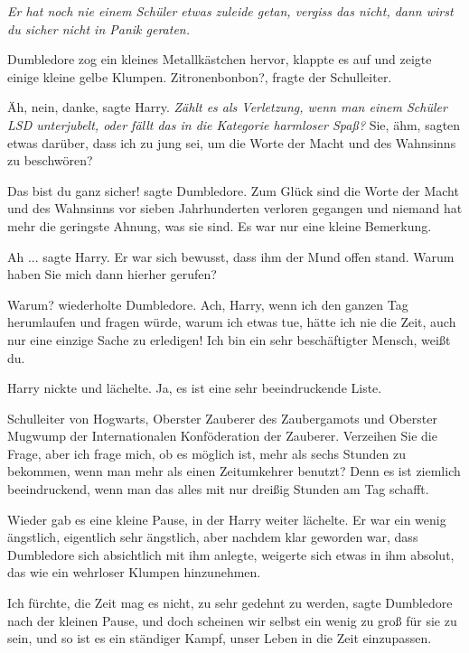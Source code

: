 \emph{Er hat noch nie einem Schüler etwas zuleide getan, vergiss das nicht, dann
wirst du sicher nicht in Panik geraten.}

Dumbledore zog ein kleines Metallkästchen hervor, klappte es auf und zeigte
einige kleine gelbe Klumpen. \glqq Zitronenbonbon?\grqq{}, fragte der
Schulleiter.

\glqq Äh, nein, danke\grqq{}, sagte Harry. \emph{Zählt es als Verletzung, wenn
man einem Schüler LSD unterjubelt, oder fällt das in die Kategorie harmloser
Spaß?} \glqq Sie, ähm, sagten etwas darüber, dass ich zu jung sei, um die Worte
der Macht und des Wahnsinns zu beschwören?\grqq{}

\glqq Das bist du ganz sicher!\grqq{} sagte Dumbledore. \glqq Zum Glück sind die
Worte der Macht und des Wahnsinns vor sieben Jahrhunderten verloren gegangen und
niemand hat mehr die geringste Ahnung, was sie sind. Es war nur eine kleine
Bemerkung.\grqq{}

\glqq Ah ...\grqq{} sagte Harry. Er war sich bewusst, dass ihm der Mund offen
stand. \glqq Warum haben Sie mich dann hierher gerufen?\grqq{}

\glqq Warum?\grqq{} wiederholte Dumbledore. \glqq Ach, Harry, wenn ich den
ganzen Tag herumlaufen und fragen würde, warum ich etwas tue, hätte ich nie die
Zeit, auch nur eine einzige Sache zu erledigen! Ich bin ein sehr beschäftigter
Mensch, weißt du.\grqq{}

Harry nickte und lächelte. \glqq Ja, es ist eine sehr beeindruckende Liste.

Schulleiter von Hogwarts, Oberster Zauberer des Zaubergamots und Oberster
Mugwump der Internationalen Konföderation der Zauberer. Verzeihen Sie die Frage,
aber ich frage mich, ob es möglich ist, mehr als sechs Stunden zu bekommen, wenn
man mehr als einen Zeitumkehrer benutzt? Denn es ist ziemlich beeindruckend,
wenn man das alles mit nur dreißig Stunden am Tag schafft.\grqq{}

Wieder gab es eine kleine Pause, in der Harry weiter lächelte. Er war ein wenig
ängstlich, eigentlich sehr ängstlich, aber nachdem klar geworden war, dass
Dumbledore sich absichtlich mit ihm anlegte, weigerte sich etwas in ihm absolut,
das wie ein wehrloser Klumpen hinzunehmen.

\glqq Ich fürchte, die Zeit mag es nicht, zu sehr gedehnt zu werden\grqq{},
sagte Dumbledore nach der kleinen Pause, \glqq und doch scheinen wir selbst ein
wenig zu groß für sie zu sein, und so ist es ein ständiger Kampf, unser Leben in
die Zeit einzupassen.\grqq{}

